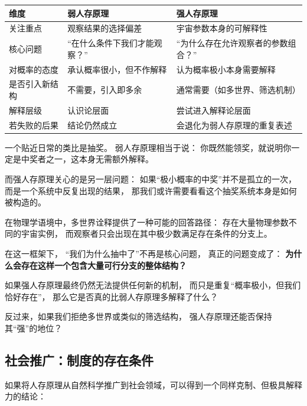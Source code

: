 \documentclass[openany, a4paper, 12pt]{book}
\begin{document}
\begin{center}
	\begin{tabular}{|p{3cm}|p{5cm}|p{5cm}|}
		\hline
		\textbf{维度} & \textbf{弱人存原理} & \textbf{强人存原理} \\
		\hline
		关注重点 &
		观察结果的选择偏差 &
		宇宙参数本身的可解释性 \\
		\hline
		核心问题 &
		“在什么条件下我们才能观察？” &
		“为什么存在允许观察者的参数组合？” \\
		\hline
		对概率的态度 &
		承认概率很小，但不作解释 &
		认为概率极小本身需要解释 \\
		\hline
		是否引入新结构 &
		不需要，引入即多余 &
		通常需要（如多世界、筛选机制） \\
		\hline
		解释层级 &
		认识论层面 &
		尝试进入解释论层面 \\
		\hline
		若失败的后果 &
		结论仍然成立 &
		会退化为弱人存原理的重复表述 \\
		\hline
	\end{tabular}
\end{center}


一个贴近日常的类比是抽奖。  
弱人存原理相当于说：  
你既然能领奖，就说明你一定是中奖者之一，这本身无需额外解释。

而强人存原理关心的是另一层问题：  
如果“极小概率的中奖”并不是孤立的一次，  
而是一个系统中反复出现的结果，  
那我们或许需要看看这个抽奖系统本身是如何被构造的。

在物理学语境中，多世界诠释提供了一种可能的回答路径：  
存在大量物理参数不同的宇宙实例，  
而观察者只会出现在其中极少数满足存在条件的分支上。

在这一框架下，  
“我们为什么抽中了”不再是核心问题，  
真正的问题变成了：  
\textbf{为什么会存在这样一个包含大量可行分支的整体结构？}

\begin{tcolorbox}[colback=gray!8, colframe=gray!50, title=\textit{思考}]
	如果强人存原理最终仍然无法提供任何新的机制，  
	而只是重复“概率极小，但我们恰好存在”，  
	那么它是否真的比弱人存原理多解释了什么？
	
	反过来，如果我们拒绝多世界或类似的筛选结构，  
	强人存原理还能否保持其“强”的地位？
\end{tcolorbox}


	\subsection{社会推广：制度的存在条件}
	
	如果将人存原理从自然科学推广到社会领域，可以得到一个同样克制、但极具解释力的结论：
	
\end{document}
